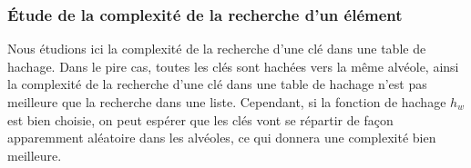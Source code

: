 \subsubsection{Étude de la complexité de la recherche d’un élément}
Nous étudions ici la complexité de la recherche d’une clé dans une table de
hachage. Dans le pire cas, toutes les clés sont hachées vers la même
alvéole, ainsi la complexité de la recherche d’une clé dans une table de
hachage n’est pas meilleure que la recherche dans une liste. Cependant,
si la fonction de hachage $h_w$ est bien choisie, on peut espérer
que les clés vont se répartir de façon apparemment aléatoire dans les
alvéoles, ce qui donnera une complexité bien meilleure.

